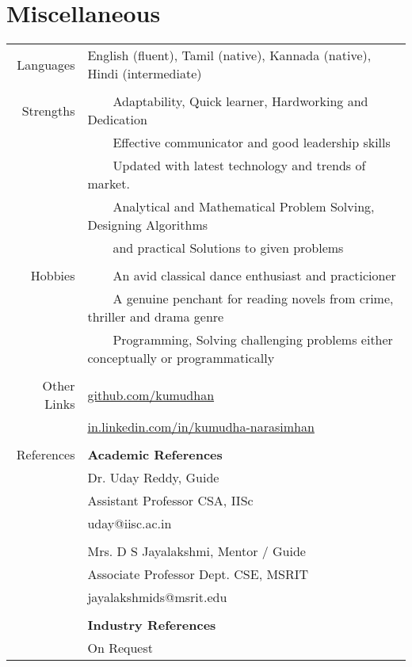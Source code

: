\documentclass[a4paper,10pt]{article} %
\newcommand{\tabitem}{~~\llap{\textbullet}~~}
\begin{document}


\section{Miscellaneous}
\begin{tabular}{rl}
Languages & English (fluent), Tamil (native), Kannada (native), Hindi (intermediate)\\
&\\
Strengths & \tabitem Adaptability, Quick learner, Hardworking and Dedication\\
& \tabitem Effective communicator and good leadership skills \\
& \tabitem Updated with latest technology and trends of market.\\
& \tabitem Analytical and Mathematical Problem Solving, Designing Algorithms \\
& ~~~~and practical Solutions to given problems \\
& \\
Hobbies & \tabitem An avid classical dance enthusiast and practicioner\\
& \tabitem A genuine penchant for reading novels from crime, thriller and drama genre\\
& \tabitem Programming, Solving challenging problems either conceptually or programmatically \\
& \\
Other Links & \href{https://github.com/kumudhan}{github.com/kumudhan} \\
& \href{http://in.linkedin.com/in/kumudha-narasimhan}{in.linkedin.com/in/kumudha-narasimhan}\\
&\\
References & \textbf{Academic References} \\
& Dr. Uday Reddy, Guide \\
& Assistant Professor CSA, IISc\\
& uday@iisc.ac.in \\
&\\
& Mrs. D S Jayalakshmi, Mentor / Guide  \\
& Associate Professor Dept. CSE, MSRIT \\
& jayalakshmids@msrit.edu\\
&\\

& \textbf{Industry References} \\
& On Request \\
\end{tabular}
\end{document}
